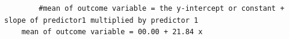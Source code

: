 \documentclass[12pt,letterpaper]{article}
\begin{document}
\begin{verbatim}
		#mean of outcome variable = the y-intercept or constant + slope of predictor1 multiplied by predictor 1 
	mean of outcome variable = 00.00 + 21.84 x 

\end{verbatim}
\newpage	
\end{document}
